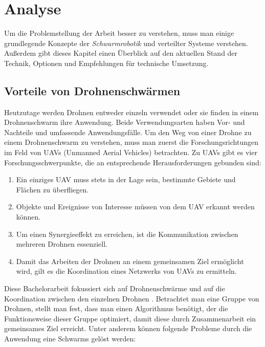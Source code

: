 \chapter{Analyse}
\label{cha:Analyse}

Um die Problemstellung der Arbeit besser zu verstehen, muss man einige grundlegende Konzepte der \textit{Schwarmrobotik} und verteilter Systeme verstehen. Außerdem gibt dieses Kapitel einen Überblick auf den aktuellen Stand der Technik, Optionen und Empfehlungen für technische Umsetzung.

\section{Vorteile von Drohnenschwärmen}

Heutzutage werden Drohnen entweder einzeln verwendet oder sie finden in einem Drohnenschwarm ihre Anwendung. Beide Verwendungsarten haben Vor- und Nachteile und umfassende Anwendungsfälle. Um den Weg von einer Drohne zu einem Drohnenschwarm zu verstehen, muss man zuerst die Forschungsrichtungen im Feld von UAVs (Unmanned Aerial Vehicles) betrachten. Zu UAVs gibt es vier Forschungsschwerpunkte, die an entsprechende Herausforderungen gebunden sind:

\begin{enumerate}
	\item Ein einziges UAV muss stets in der Lage sein, bestimmte Gebiete und Flächen zu überfliegen.
	\item Objekte und Ereignisse von Interesse müssen von dem UAV erkannt werden können.
	\item Um einen Synergieeffekt zu erreichen, ist die Kommunikation zwischen mehreren Drohnen essenziell.
	\item Damit das Arbeiten der Drohnen an einem gemeinsamen Ziel ermöglicht wird, gilt es die Koordination eines Netzwerks von UAVs zu ermitteln.
\end{enumerate}

Diese Bachelorarbeit fokussiert sich auf Drohnenschwärme und auf die Koordination zwischen den einzelnen Drohnen \cite{Mondada03swarm-bot:a}. Betrachtet man eine Gruppe von Drohnen, stellt man fest, dass man einen Algorithmus benötigt, der die Funktionsweise dieser Gruppe optimiert, damit diese durch Zusammenarbeit ein gemeinsames Ziel erreicht. Unter anderem können folgende Probleme durch die Anwendung eine Schwarms gelöst werden:


